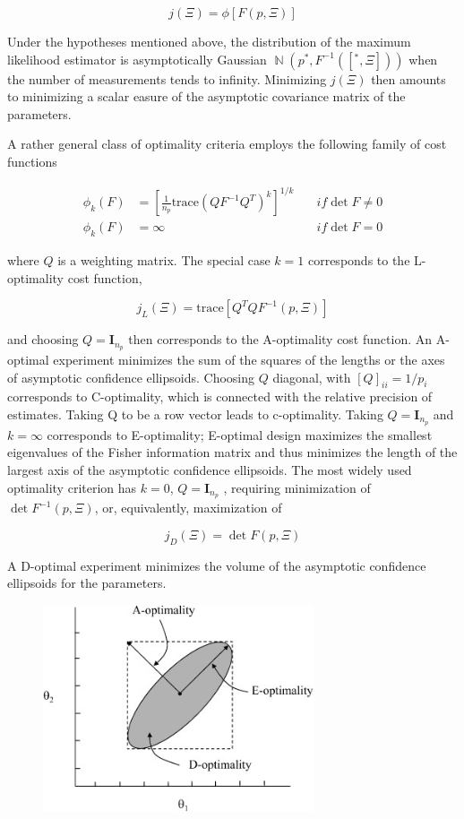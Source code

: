 \documentclass[]{scrartcl}
\begin{document}
\begin{equation}
	j(\Xi) = \phi\left[ F(p, \Xi) \right]
\end{equation}

Under the hypotheses mentioned above, the distribution of the maximum likelihood estimator is asymptotically Gaussian $\mathop{\mathbb{N}} (p^*, F^{-1}([^*, \Xi])) $ when the number of measurements tends to infinity. Minimizing $j(\Xi)$ then amounts to minimizing a scalar easure of the asymptotic covariance matrix of the parameters.

A rather general class of optimality criteria employs the following family of cost functions

\begin{align}
	\phi_k(F) &= \left[\frac{1}{n_p} \text{trace}\left( QF^{-1}Q^T \right)^k \right]^{1/k} \quad &if \det F \neq 0 \nonumber \\
	\phi_k(F) &= \infty \quad &if \det F = 0
\end{align}

where $Q$ is a weighting matrix. The special case $k = 1$ corresponds to the L-optimality cost function,

\begin{equation}
	j_L(\Xi) = \text{trace} \left[ Q^TQF^{-1}(p,\Xi) \right]
\end{equation}

and choosing $Q = \textbf{I}_{n_p}$ then corresponds to the A-optimality cost function. An A-optimal experiment minimizes the sum of the squares of the lengths or the axes of asymptotic confidence ellipsoids. Choosing $Q$ diagonal, with $[Q]_{ii} = 1/p_i$ corresponds to C-optimality, which is connected with the relative precision of estimates. Taking Q to be a row vector leads to c-optimality. Taking $Q = \textbf{I}_{n_p}$ and $k = \infty$ corresponds to E-optimality; E-optimal design maximizes the smallest eigenvalues of the Fisher information matrix and thus minimizes the length of the largest axis of the asymptotic confidence ellipsoids. The most widely used optimality criterion has $k = 0$, $Q = \textbf{I}_{n_p}$ , requiring minimization of $\det F^{-1}(p, \Xi)$, or, equivalently, maximization of

\begin{equation}
	j_D(\Xi) = \det F(p, \Xi)
\end{equation}

A D-optimal experiment minimizes the volume of the asymptotic confidence ellipsoids for the parameters.

\begin{figure}[h]
	\centering
	\includegraphics[width=8cm]{DOE_conditions.jpg}
\end{figure}
\end{document}
